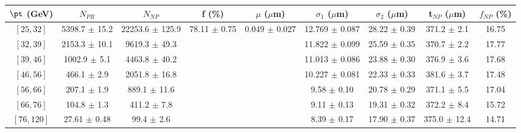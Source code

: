 \begin{tabular}{c||c|c|c|c|c|c|c||c}
$\pt$ (GeV) & $N_{PR}$ & $N_{NP}$ & f (\%) & $\mu$ ($\mu$m) & $\sigma_1$ ($\mu$m) & $\sigma_2$ ($\mu$m)  & t$_{NP}$ ($\mu$m) & $f_{NP}$ (\%) \\
\hline
$[25, 32]$ & 5398.7 $\pm$ 15.2 & 22253.6 $\pm$ 125.9 & \multirow{7}{*}{78.11 $\pm$ 0.75} & \multirow{7}{*}{0.049 $\pm$ 0.027} & 12.769 $\pm$ 0.087 & 28.22 $\pm$ 0.39 & 371.2 $\pm$ 2.1 & 16.75\\
$[32, 39]$ & 2153.3 $\pm$ 10.1 & 9619.3 $\pm$ 49.3 &  &  & 11.822 $\pm$ 0.099 & 25.59 $\pm$ 0.35 & 370.7 $\pm$ 2.2 & 17.77\\
$[39, 46]$ & 1002.9 $\pm$ 5.1 & 4463.8 $\pm$ 40.2 &  &  & 11.013 $\pm$ 0.086 & 23.88 $\pm$ 0.30 & 376.9 $\pm$ 3.6 & 17.68\\
$[46, 56]$ & 466.1 $\pm$ 2.9 & 2051.8 $\pm$ 16.8 &  &  & 10.227 $\pm$ 0.081 & 22.33 $\pm$ 0.33 & 381.6 $\pm$ 3.7 & 17.48\\
$[56, 66]$ & 207.1 $\pm$ 1.9 & 889.1 $\pm$ 11.6 &  &  & 9.58 $\pm$ 0.10 & 20.78 $\pm$ 0.29 & 371.1 $\pm$ 5.5 & 17.04\\
$[66, 76]$ & 104.8 $\pm$ 1.3 & 411.2 $\pm$ 7.8 &  &  & 9.11 $\pm$ 0.13 & 19.31 $\pm$ 0.32 & 372.2 $\pm$ 8.4 & 15.72\\
$[76, 120]$ & 27.61 $\pm$ 0.48 & 99.4 $\pm$ 2.6 &  &  & 8.39 $\pm$ 0.17 & 17.90 $\pm$ 0.37 & 375.0 $\pm$ 12.4 & 14.71\\
\end{tabular}
